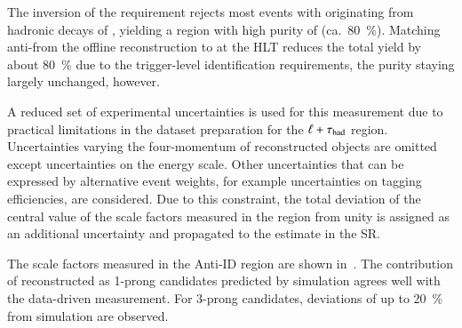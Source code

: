The inversion of the \tauid requirement rejects most \ttbar events
with \tauhadvis originating from hadronic decays of \tauleptons,
yielding a region with high purity of \ttbarFakes
(ca.~\SI{80}{\percent}). Matching anti-\tauhadvis from the offline
reconstruction to \tauhadvis at the HLT reduces the total \ttbarFakes
yield by about \SI{80}{\percent} due to the trigger-level
identification requirements, the \ttbarFakes purity staying largely
unchanged, however.

A reduced set of experimental uncertainties is used for this
measurement due to practical limitations in the dataset preparation
for the $\ell + \tau_{\text{had}}$ \antiid region. Uncertainties varying the
four-momentum of reconstructed objects are omitted except
uncertainties on the \tauhadvis energy scale. Other uncertainties that
can be expressed by alternative event weights, for example
uncertainties on tagging efficiencies, are considered. Due to this
constraint, the total deviation of the central value of the scale
factors measured in the \antiid region from unity is assigned as an
additional uncertainty and propagated to the \multijet estimate in the
\hadhad SR.

The scale factors measured in the Anti-ID region are shown
in~. The contribution of \faketauhadvis
reconstructed as 1-prong candidates predicted by simulation agrees
well with the data-driven measurement. For 3-prong candidates,
deviations of up to \SI{20}{\percent} from simulation are observed.

